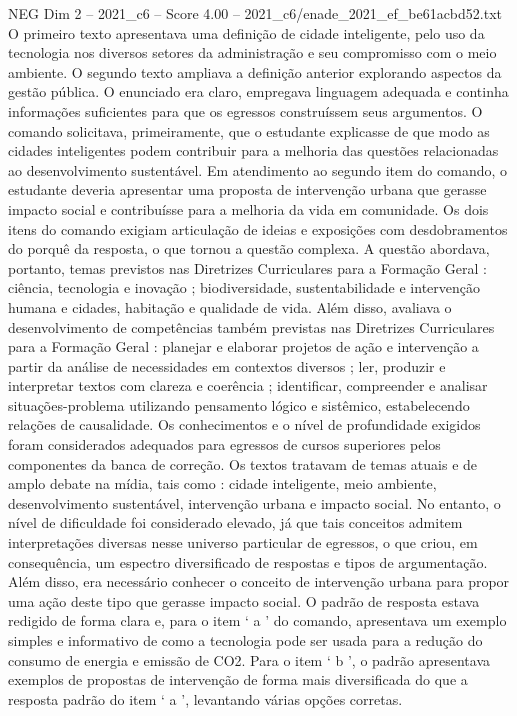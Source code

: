\begin{textsample}{NEG Dim 2 – 2021\_c6 – Score 4.00 – 2021\_c6/enade\_2021\_ef\_be61acbd52.txt}
O primeiro texto apresentava uma definição de cidade inteligente, pelo uso da tecnologia nos diversos setores da administração e seu compromisso com o meio ambiente.
O segundo texto ampliava a definição anterior explorando aspectos da gestão pública.
O enunciado era claro, empregava linguagem adequada e continha informações suficientes para que os egressos construíssem seus argumentos.
O comando solicitava, primeiramente, que o estudante explicasse de que modo as cidades inteligentes podem contribuir para a melhoria das questões relacionadas ao desenvolvimento sustentável.
Em atendimento ao segundo item do comando, o estudante deveria apresentar uma proposta de intervenção urbana que gerasse impacto social e contribuísse para a melhoria da vida em comunidade.
Os dois itens do comando exigiam articulação de ideias e exposições com desdobramentos do porquê da resposta, o que tornou a questão complexa.
A questão abordava, portanto, temas previstos nas Diretrizes Curriculares para a Formação Geral : ciência, tecnologia e inovação ; biodiversidade, sustentabilidade e intervenção humana e cidades, habitação e qualidade de vida.
Além disso, avaliava o desenvolvimento de competências também previstas nas Diretrizes Curriculares para a Formação Geral : planejar e elaborar projetos de ação e intervenção a partir da análise de necessidades em contextos diversos ; ler, produzir e interpretar textos com clareza e coerência ; identificar, compreender e analisar situações-problema utilizando pensamento lógico e sistêmico, estabelecendo relações de causalidade.
Os conhecimentos e o nível de profundidade exigidos foram considerados adequados para egressos de cursos superiores pelos componentes da banca de correção.
Os textos tratavam de temas atuais e de amplo debate na mídia, tais como : cidade inteligente, meio ambiente, desenvolvimento sustentável, intervenção urbana e impacto social.
No entanto, o nível de dificuldade foi considerado elevado, já que tais conceitos admitem interpretações diversas nesse universo particular de egressos, o que criou, em consequência, um espectro diversificado de respostas e tipos de argumentação.
Além disso, era necessário conhecer o conceito de intervenção urbana para propor uma ação deste tipo que gerasse impacto social.
O padrão de resposta estava redigido de forma clara e, para o item ‘ a ’ do comando, apresentava um exemplo simples e informativo de como a tecnologia pode ser usada para a redução do consumo de energia e emissão de CO2.
Para o item ‘ b ’, o padrão apresentava exemplos de propostas de intervenção de forma mais diversificada do que a resposta padrão do item ‘ a ’, levantando várias opções corretas.

\end{textsample}
